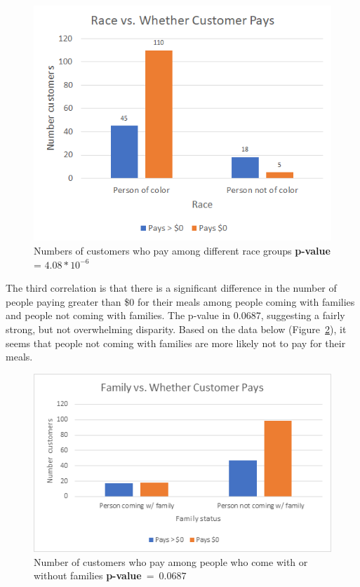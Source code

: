 \begin{figure}[H]
    \centering \includegraphics*[scale=.5]{assets/race-v-pay.png}
    
    \caption{Numbers of customers who pay among different race groups
    \textbf{p-value} = \(4.08 * 10^{-6}\)}\label{fig:race-v-pay}
\end{figure}

The third correlation is that there is a significant difference in the number of people paying greater than \$0 for their meals among people coming with families and people not coming with families. The p-value in 0.0687, suggesting a fairly strong, but not overwhelming disparity. Based on the data below (Figure~\ref{fig:family-v-pay}), it seems that people not coming with families are more likely not to pay for their meals.

\begin{figure}[H]
    \centering \includegraphics*[scale=.5]{assets/family-v-pay.png}
    
    \caption{Number of customers who pay among people who come with or without families \textbf{p-value}~=~\(0.0687\)}\label{fig:family-v-pay}
\end{figure}

